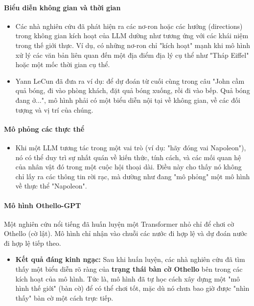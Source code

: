 \paragraph{Biểu diễn không gian và thời gian}
\begin{itemize}
    \item Các nhà nghiên cứu đã phát hiện ra các nơ-ron hoặc các hướng (directions) trong không gian kích hoạt của LLM dường như tương ứng với các khái niệm trong thế giới thực. Ví dụ, có những nơ-ron chỉ "kích hoạt" mạnh khi mô hình xử lý các văn bản liên quan đến một địa điểm địa lý cụ thể như "Tháp Eiffel" hoặc một mốc thời gian cụ thể.
    \item Yann LeCun đã đưa ra ví dụ: để dự đoán từ cuối cùng trong câu "John cầm quả bóng, đi vào phòng khách, đặt quả bóng xuống, rồi đi vào bếp. Quả bóng đang ở...", mô hình phải có một biểu diễn nội tại về không gian, về các đối tượng và vị trí của chúng.
\end{itemize}

\paragraph{Mô phỏng các thực thể}
\begin{itemize}
    \item Khi một LLM tương tác trong một vai trò (ví dụ: "hãy đóng vai Napoleon"), nó có thể duy trì sự nhất quán về kiến thức, tính cách, và các mối quan hệ của nhân vật đó trong một cuộc hội thoại dài. Điều này cho thấy nó không chỉ lấy ra các thông tin rời rạc, mà dường như đang "mô phỏng" một mô hình về thực thể "Napoleon".
\end{itemize}

\paragraph{Mô hình Othello-GPT}
Một nghiên cứu nổi tiếng đã huấn luyện một Transformer nhỏ chỉ để chơi cờ Othello (cờ lật). Mô hình chỉ nhận vào chuỗi các nước đi hợp lệ và dự đoán nước đi hợp lệ tiếp theo.
\begin{itemize}
    \item \textbf{Kết quả đáng kinh ngạc:} Sau khi huấn luyện, các nhà nghiên cứu đã tìm thấy một biểu diễn rõ ràng của \textbf{trạng thái bàn cờ Othello} bên trong các kích hoạt của mô hình. Tức là, mô hình đã tự học cách xây dựng một "mô hình thế giới" (bàn cờ) để có thể chơi tốt, mặc dù nó chưa bao giờ được "nhìn thấy" bàn cờ một cách trực tiếp.
\end{itemize}

